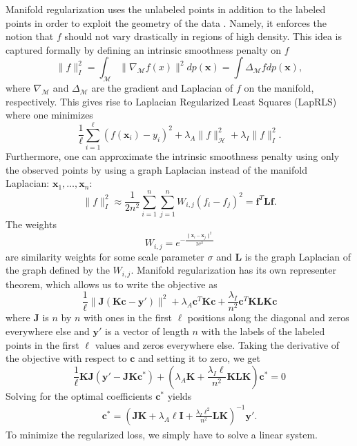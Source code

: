 \documentclass[anon,11pt]{9520} %
\newcommand{\mb}{\mathbf}
\begin{document}
Manifold regularization uses the unlabeled points in addition to the labeled points in
order to exploit the geometry of the data \cite{Belkin1}\cite{Belkin2}\cite{Belkin3}. Namely, it enforces the notion
that $f$ should not vary drastically in regions of high density. This idea
is captured formally by defining an intrinsic smoothness penalty on
$f$ \[\|f\|^2_{I} = \int_{\mathcal{M}} \|\nabla_{\mathcal{M}} f(x)\|^2 dp(\mb x)
= \int\Delta_{\mathcal{M}}f dp(\mb x), \] 
where $\nabla_{\mathcal{M}}$ and $\Delta_{\mathcal{M}}$ are the gradient and Laplacian of $f$ on the manifold,
respectively. This gives rise to Laplacian Regularized Least Squares (LapRLS)
where one minimizes 
\[ \frac{1}{\ell} \sum_{i=1}^{\ell} (f(\mb{x}_i)-y_i)^2 + \lambda_A \|f\|_{\mathcal{H}}^2 + \lambda_I\|f\|_I^2.\]
Furthermore, one can approximate the intrinsic smoothness penalty using only the
observed points by using a graph Laplacian instead of the manifold Laplacian:
$\mb x_1, \dots, \mb x_n$:
\[\|f\|^2_I \approx \frac{1}{2n^2} \sum_{i=1}^{n} \sum_{j=1}^{n} W_{i,j}(f_i-f_j)^2 = \mb f^T \mb L \mb f.\]
The weights
\[W_{i,j} = e^{-\frac{\|\mb{x}_i-\mb{x}_j\|^2}{2\sigma^2}}\]
are similarity weights for some scale parameter $\sigma$ and $\mb L$ is the
graph Laplacian of the graph defined by the $W_{i,j}$. Manifold regularization
has its own representer theorem, which allows us to write the objective as
\[ \frac{1}{\ell} \|\mb J(\mb K \mb c-\mb y')\|^2 + \lambda_A \mb c^T \mb K \mb c + \frac{\lambda_I}{n^2} \mb c^T \mb K \mb L \mb K \mb c \]
where $\mb{J}$ is $n$ by $n$ with ones in the first $\ell$ positions along the
diagonal and zeros everywhere else and $\mb y'$ is a vector of length $n$ with
the labels of the labeled points in the first $\ell$ values and zeros everywhere
else. Taking the derivative of the objective with respect to $\mb c$ and setting it
to zero, we get
\[ \frac{1}{\ell} \mb K \mb J \left(\mb y' - \mb J \mb K \mb c^* \right) + \left( \lambda_A \mb K  + \frac{\lambda_I \ell}{n^2} \mb K \mb L \mb K \right) \mb c^* = 0 \]
Solving for the optimal coefficients $\mb c^*$ yields
\begin{gather}
\mb c^* = \left( \mb J \mb K + \lambda_A \ell \mb I + \frac{\lambda_I\ell^2}{n^2} \mb L \mb K \right)^{-1} \mb y'. \label{eqn:claprls}
\end{gather}
To minimize the regularized loss, we simply have to solve a linear system.
\end{document}

